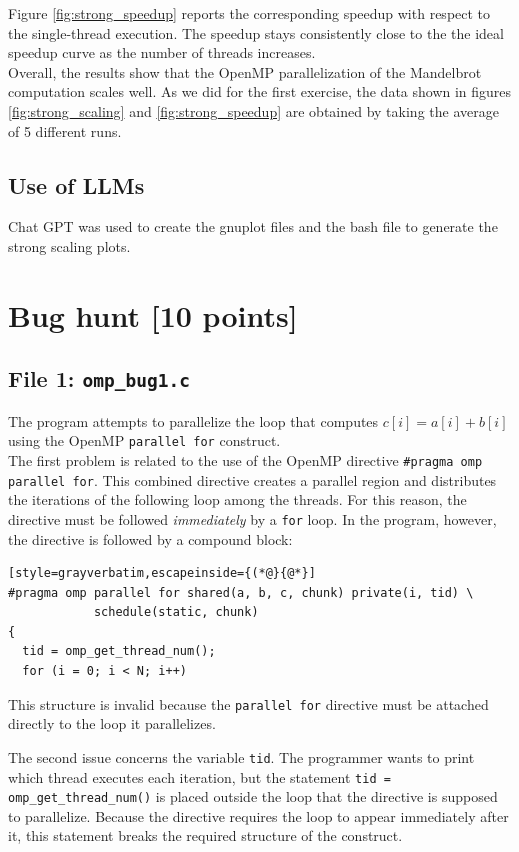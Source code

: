 \documentclass[unicode,10pt,a4paper,oneside,numbers=endperiod,openany]{scrartcl}
\begin{document}
Figure \ref{fig:strong_speedup} reports the corresponding speedup with respect to the single-thread execution. The speedup stays consistently close to the the ideal speedup curve as the number of threads increases.\\

Overall, the results show that the OpenMP parallelization of the Mandelbrot computation scales well.
As we did for the first exercise, the data shown in figures \ref{fig:strong_scaling} and \ref{fig:strong_speedup} are obtained by taking the average of 5 different runs. 

\subsection{Use of LLMs}
Chat GPT was used to create the gnuplot files and the bash file to generate the strong scaling plots.
\newpage

\section{Bug hunt [10 points]}
\subsection{File 1:   \texttt{omp\_bug1.c}}

The program attempts to parallelize the loop that computes $c[i] = a[i] + b[i] $
using the OpenMP \texttt{parallel for} construct.\\
The first problem is related to the use of the OpenMP directive
\texttt{\#pragma omp parallel for}. This combined directive creates a parallel
region and distributes the iterations of the following loop among the threads.
For this reason, the directive must be followed \emph{immediately} by a
\texttt{for} loop. In the program, however, the directive is followed by a
compound block:

\begin{lstlisting}[style=grayverbatim,escapeinside={(*@}{@*}]
#pragma omp parallel for shared(a, b, c, chunk) private(i, tid) \
            schedule(static, chunk)
{
  tid = omp_get_thread_num();
  for (i = 0; i < N; i++)
\end{lstlisting}

This structure is invalid because the \texttt{parallel for} directive must be
attached directly to the loop it parallelizes.

The second issue concerns the variable \texttt{tid}. The programmer wants to
print which thread executes each iteration, but the statement \texttt{tid = omp\_get\_thread\_num()} is placed outside the loop that the directive is supposed to parallelize. Because the directive requires the loop to appear immediately after it, this
statement breaks the required structure of the construct.
\end{document}
